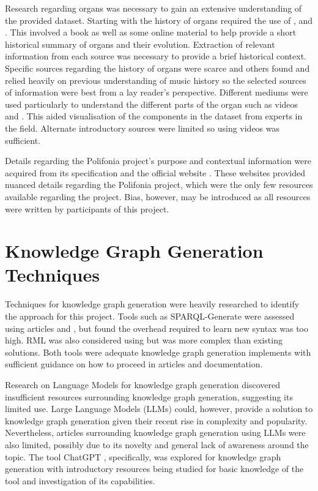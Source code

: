 Research regarding organs was necessary to gain an extensive understanding of the provided dataset. Starting with the history of organs required the use of \cite{organhistory}, \cite{organhistory1} and \cite{organmedivalhistory}. This involved a book as well as some online material to help provide a short historical summary of organs and their evolution. Extraction of relevant information from each source was necessary to provide a brief historical context. Specific sources regarding the history of organs were scarce and others found \cite{apel1948early} and \cite{ochse1988history} relied heavily on previous understanding of music history so the selected sources of information were best from a lay reader's perspective. Different mediums were used particularly to understand the different parts of the organ such as videos \cite{organvideo} and \cite{organvideo1}. This aided visualisation of the components in the dataset from experts in the field. Alternate introductory sources were limited so using videos was sufficient. 

Details regarding the Polifonia project's purpose and contextual information were acquired from its specification \cite{polifoniaproject} and the official website \cite{polifonia}. These websites provided nuanced details regarding the Polifonia project, which were the only few resources available regarding the project. Bias, however, may be introduced as all resources were written by participants of this project. 

\section{Knowledge Graph Generation Techniques}
\hspace{0.5cm} Techniques for knowledge graph generation were heavily researched to identify the approach for this project. Tools such as SPARQL-Generate \cite{sparqlgenerate} were assessed using articles \cite{lefranccois2017flexible} and \cite{lefranccois2017sparql}, but found the overhead required to learn new syntax was too high. RML \cite{rml} was also considered using \cite{dimou2014rml} but was more complex than existing solutions. Both tools were adequate knowledge graph generation implements with sufficient guidance on how to proceed in articles and documentation. 

Research on Language Models for knowledge graph generation discovered insufficient resources surrounding knowledge graph generation, suggesting its limited use. Large Language Models (LLMs) \cite{rouse_2023} could, however, provide a solution to knowledge graph generation given their recent rise in complexity and popularity. Nevertheless, articles surrounding knowledge graph generation using LLMs were also limited, possibly due to its novelty and general lack of awareness around the topic. The tool ChatGPT \cite{chatgptwebsite}, specifically, was explored for knowledge graph generation with introductory resources \cite{chatgpt} being studied for basic knowledge of the tool and investigation of its capabilities. 

